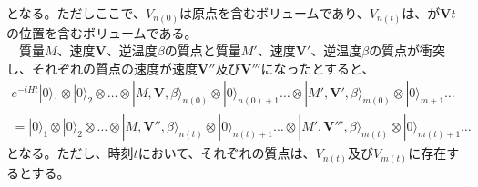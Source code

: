 となる。ただしここで、$V_{n(0)}$は原点を含むボリュームであり、$V_{n(t)}$は、が$\mathbf{V}t$の位置を含むボリュームである。\\
　質量$M$、速度$\mathbf{V}$、逆温度$\beta$の質点と質量$M'$、速度$\mathbf{V}'$、逆温度$\beta$の質点が衝突し、それぞれの質点の速度が速度$\mathbf{V}''$及び$\mathbf{V}'''$になったとすると、
\begin{equation}
\begin{aligned}
    e^{-iHt}|0\rangle_1 \otimes |0\rangle_2 \otimes \ldots \otimes |M,\mathbf{V},\beta \rangle_{n(0)} \otimes |0\rangle_{n(0)+1} \ldots \otimes |M',\mathbf{V}',\beta \rangle_{m(0)} \otimes |0\rangle_{m+1} \ldots \\
    =  |0\rangle_{1} \otimes |0\rangle_{2} \otimes \ldots \otimes |M,\mathbf{V}'',\beta \rangle_{n(t)} \otimes |0\rangle_{n(t)+1} \ldots
    \otimes |M',\mathbf{V}''',\beta \rangle_{m(t)} \otimes |0\rangle_{m(t)+1} \ldots 
\end{aligned}
\end{equation}
となる。ただし、時刻$t$において、それぞれの質点は、$V_{n(t)}$及び$V_{m(t)}$に存在するとする。\\
